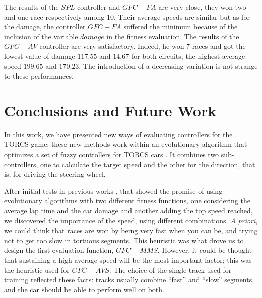\documentclass[conference]{IEEEtran}
\begin{document}
The results of the $SPL$ controller and $GFC-FA$ are very close, they won two and one race respectively among 10. Their average speeds are similar but as for the damage, the controller $GFC-FA$ suffered the minimum because of the inclusion of the variable $damage$ in the fitness evaluation.
The results of the $GFC-AV$ controller are very satisfactory. Indeed, he won 7 races and got the lowest value of damage $117.55$ and $14.67$ for both circuits, the highest average speed $199.65$ and $170.23$.
The introduction of a decreasing variation is not strange to these performances.




\section{Conclusions and Future Work} 
\label{sec:conclusions}


In this work, we have presented new ways of evaluating controllers
for the TORCS game; these new methods work within an evolutionary
algorithm that optimizes a set of fuzzy controllers for TORCS cars \cite{salem_evo18}. It combines two sub-controllers, one to calculate the target speed and the other for the direction, that is, for driving the steering wheel. 

After initial tests in previous works \cite{salem_evo17,salem_evo18}, that showed the promise of using evolutionary algorithms with two different fitness functions, one considering the average lap time and the car damage and another adding the top speed reached, we discovered the importance of the speed, using different
combinations. {\em A priori}, we could think that races are won by
being very fast when you can be, and trying not to get too slow in
tortuous segments. This heuristic was what drove us to design the
first evaluation function, \textbf{$GFC-MMS$}. However, it could be
thought that sustaining a high average speed will be the most
important factor; this was the heuristic used for \textbf{$GFC-AVS$}. 
The choice of the single track used for training reflected these facts: tracks usually combine ``fast'' and ``slow'' segments, and the car should be able to perform well on both.
\end{document}
